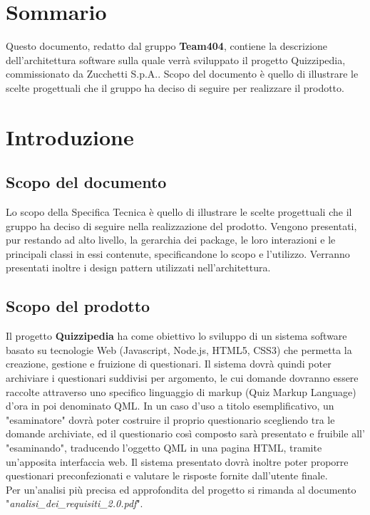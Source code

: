 \rigaregistro{0.0.17}{Luca Alessio (Progettista)}{12/05/2016}{Termine stesura sezione diagrammi e revisione/ampliamento di vari paragrafi}\documentclass[a4paper,11pt]{article}
\begin{document}
	\newpage
	\fancyhead[R]{\leftmark}
	\tableofcontents
	\newpage
	\listoffigures
	\listoftables
	
	\newpage
	
	\section*{Sommario}
	Questo documento, redatto dal gruppo \textbf{Team404}, contiene la descrizione dell'architettura software sulla quale verrà sviluppato il progetto Quizzipedia, commissionato da Zucchetti S.p.A..
Scopo del documento è quello di illustrare le scelte progettuali che il gruppo ha deciso di
seguire per realizzare il prodotto.
	
	\newpage
	\section{Introduzione}
	\subsection{Scopo del documento}
	Lo scopo della Specifica Tecnica è quello di illustrare le scelte progettuali che il gruppo ha deciso di seguire nella realizzazione del prodotto. Vengono presentati, pur restando ad alto
livello, la gerarchia dei package, le loro interazioni e le principali classi in essi contenute, specificandone lo scopo e l'utilizzo. Verranno presentati inoltre i design pattern utilizzati nell'architettura.
	
	\subsection{Scopo del prodotto}
	Il progetto \textbf{Quizzipedia} ha come obiettivo lo sviluppo di un sistema software basato su tecnologie Web (Javascript\addglos, Node.js\addglos, HTML5\addglos, CSS3\addglos) che permetta la creazione, gestione e fruizione di questionari. Il sistema dovrà quindi poter archiviare i questionari suddivisi per argomento, le cui domande dovranno essere raccolte attraverso uno specifico linguaggio di markup (Quiz Markup Language) d'ora in poi denominato QML\addglos. In un caso d'uso a titolo esemplificativo, un "esaminatore" dovrà poter costruire il proprio questionario scegliendo tra le domande archiviate, ed il questionario così composto sarà presentato e fruibile all' "esaminando", traducendo l'oggetto QML in una pagina HTML\addglos, tramite un'apposita interfaccia web. Il sistema presentato dovrà inoltre poter proporre questionari preconfezionati e valutare le risposte fornite dall'utente finale.
	\\
	Per un'analisi più precisa ed approfondita del progetto si rimanda al documento\\ "\textit{analisi\_dei\_requisiti\_2.0.pdf}".
\end{document}
